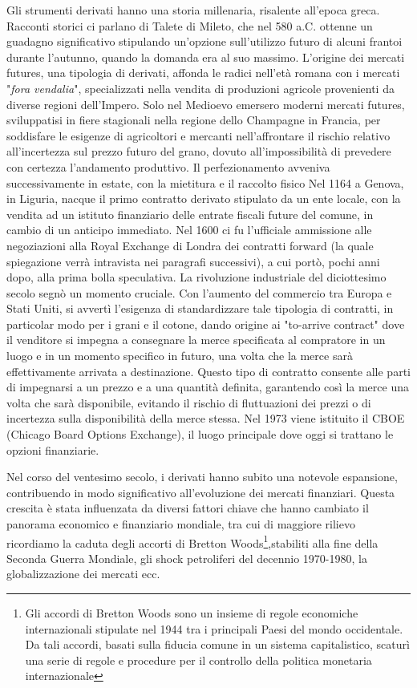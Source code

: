 \documentclass[12pt,a4paper]{report}
\begin{document}
Gli strumenti derivati hanno una storia millenaria, risalente all'epoca greca. Racconti storici ci parlano di Talete di Mileto, che nel 580 a.C. ottenne un guadagno significativo stipulando un'opzione sull'utilizzo futuro di alcuni frantoi durante l'autunno, quando la domanda era al suo massimo.
L'origine dei mercati futures, una tipologia di derivati, affonda le radici nell'età romana con i mercati "\textit{fora vendalia}", specializzati nella vendita di produzioni agricole provenienti da diverse regioni dell'Impero. Solo nel Medioevo emersero moderni mercati futures, sviluppatisi in fiere stagionali nella regione dello Champagne in Francia, per soddisfare le esigenze di agricoltori e mercanti nell'affrontare il rischio relativo all'incertezza sul prezzo futuro del grano, dovuto all'impossibilità di prevedere con certezza l'andamento produttivo. Il perfezionamento avveniva successivamente in estate, con la mietitura e il raccolto fisico
Nel 1164 a Genova, in Liguria, nacque il primo contratto derivato stipulato  da un ente locale, con la vendita ad un istituto finanziario delle entrate fiscali future del comune, in cambio di un anticipo immediato.
Nel 1600 ci fu l'ufficiale ammissione alle negoziazioni alla Royal Exchange di Londra dei contratti forward (la quale spiegazione verrà intravista nei paragrafi successivi), a cui portò, pochi anni dopo, alla prima bolla speculativa.
La rivoluzione industriale del diciottesimo secolo segnò un momento cruciale. Con l'aumento del commercio tra Europa e Stati Uniti, si avvertì l'esigenza di standardizzare tale tipologia di contratti, in particolar modo per i grani e il cotone, dando origine ai "to-arrive contract" dove il venditore si impegna a consegnare la merce specificata al compratore in un luogo e in un momento specifico in futuro, una volta che la merce sarà effettivamente arrivata a destinazione. Questo tipo di contratto consente alle parti di impegnarsi a un prezzo e a una quantità definita, garantendo così la merce una volta che sarà disponibile, evitando il rischio di fluttuazioni dei prezzi o di incertezza sulla disponibilità della merce stessa. 
Nel 1973 viene istituito il CBOE (Chicago Board Options Exchange), il luogo principale dove oggi si trattano le opzioni finanziarie.


Nel corso del ventesimo secolo, i derivati hanno subito una notevole espansione, contribuendo in modo significativo all'evoluzione dei mercati finanziari. Questa crescita è stata influenzata da diversi fattori chiave che hanno cambiato il panorama economico e finanziario mondiale, tra cui di maggiore rilievo ricordiamo la caduta degli accorti di Bretton Woods\footnote{Gli accordi di Bretton Woods sono un insieme di regole economiche internazionali stipulate nel 1944 tra i principali Paesi del mondo occidentale. Da tali accordi, basati sulla fiducia comune in un sistema capitalistico, scaturì una serie di regole e procedure per il controllo della politica monetaria internazionale},stabiliti alla fine della Seconda Guerra Mondiale, gli shock petroliferi del decennio 1970-1980, la globalizzazione dei mercati ecc.
\end{document}
